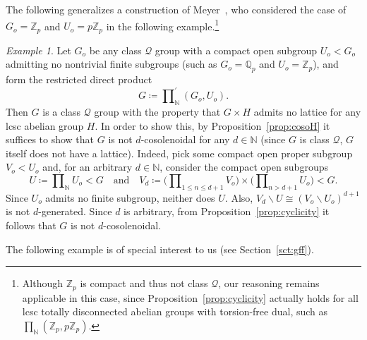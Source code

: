 \documentclass{amsart}
\numberwithin{equation}{subsection}
\theoremstyle{remark}
\newtheorem{exm}[thm]{Example}
\begin{document}
The following generalizes a construction of Meyer~\cite[Ch. II, \S11]{meyer1972algebraic}, who considered the case of \(G_{o}=\mathbb{Z}_{p}\) and \(U_{o}=p\mathbb{Z}_{p}\) in the following example.\footnote{Although \(\mathbb{Z}_{p}\) is compact and thus not class \(\mathcal{Q}\), our reasoning remains applicable in this case, since Proposition~\ref{prop:cyclicity} actually holds for all lcsc totally disconnected abelian groups with torsion-free dual, such as \(\prod\nolimits_{\mathbb{N}}\left(\mathbb{Z}_{p},p\mathbb{Z}_{p}\right)\).}

\begin{exm}\label{exm:Meyer}
Let \(G_{o}\) be any class \(\mathcal{Q}\) group with a compact open subgroup \(U_{o}<G_{o}\) admitting no nontrivial finite subgroups (such as \(G_{o}=\mathbb{Q}_{p}\) and \(U_{o}=\mathbb{Z}_{p}\)), and form the restricted direct product
\[G\coloneqq\prod\nolimits_{\mathbb{N}}^{\prime}\left(G_{o},U_{o}\right).\]
Then \(G\) is a class \(\mathcal{Q}\) group with the property that \(G\times H\) admits no lattice for any lcsc abelian group \(H\). In order to show this, by Proposition~\ref{prop:cosoH} it suffices to show that \(G\) is not \(d\)-cosolenoidal for any \(d\in\mathbb{N}\) (since \(G\) is class \(\mathcal{Q}\), \(G\) itself does not have a lattice). Indeed, pick some compact open proper subgroup \(V_{o}<U_{o}\) and, for an arbitrary \(d\in\mathbb{N}\), consider the compact open subgroups
\[U\coloneqq\prod\nolimits_{\mathbb{N}}U_{o}<G\quad\text{and}\quad V_{d}\coloneqq\big(\prod\nolimits_{1\leq n\leq d+1}V_{o}\big)\times\big(\prod\nolimits_{n>d+1}U_{o}\big)<G.\]
Since \(U_{o}\) admits no finite subgroup, neither does \(U\). Also, \(V_{d}\backslash U\cong\left(V_{o}\backslash U_{o}\right)^{d+1}\) is not \(d\)-generated. Since \(d\) is arbitrary, from Proposition~\ref{prop:cyclicity} it follows that \(G\) is not \(d\)-cosolenoidal.
\end{exm}

The following example is of special interest to us (see Section~\ref{sct:gff}).
\end{document}

